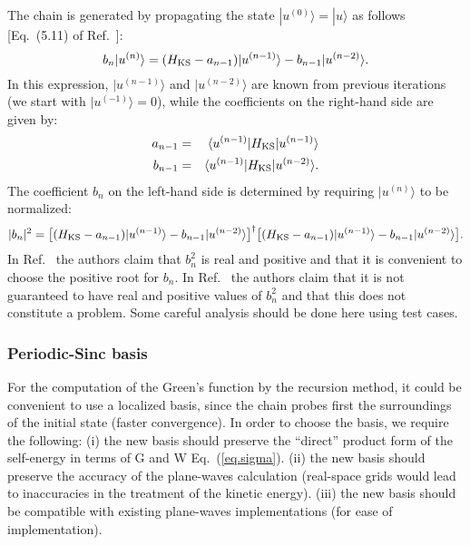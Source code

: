 \documentclass[12pt]{article}
\begin{document}
\noindent
The chain is generated by propagating the state $|u^{(0)}\rangle = |u\rangle$ as follows [Eq.\ (5.11) of Ref.\ \cite{haydock.ssp}]:
  \begin{equation}
  b_n |u^{(n)}\rangle = (H_{\rm KS}-a_{n-1})|u^{(n-1)}\rangle - b_{n-1} |u^{(n-2)}\rangle.
  \end{equation}
In this expression, $|u^{(n-1)}\rangle$ and $|u^{(n-2)}\rangle$ are known from previous iterations (we start with
$|u^{(-1)}\rangle=0$), while the coefficients on the right-hand side are given by:
  \begin{eqnarray}
  a_{n-1}&=& \langle u^{(n-1)}|H_{\rm KS}|u^{(n-1)}\rangle\\
  b_{n-1}&=& \langle u^{(n-1)}|H_{\rm KS}|u^{(n-2)}\rangle.
  \end{eqnarray}
The coefficient $b_n$ on the left-hand side is determined by requiring $|u^{(n)}\rangle$ to be normalized:
  \begin{equation}
  |b_n|^2 = \big[(H_{\rm KS}-a_{n-1})|u^{(n-1)}\rangle - b_{n-1} |u^{(n-2)}\rangle \big]^\dagger 
            \big[(H_{\rm KS}-a_{n-1})|u^{(n-1)}\rangle - b_{n-1} |u^{(n-2)}\rangle \big].
  \end{equation}
In Ref.\ \cite{haydock.ssp} the authors claim that $b_n^2$ is real and positive and that it is convenient
to choose the positive root for $b_n$. In Ref.\ \cite{ballentine} the authors claim that it is not guaranteed
to have real and positive values of $b_n^2$ and that this does not constitute a problem. Some careful
analysis should be done here using test cases.

\subsubsection*{Periodic-Sinc basis}

For the computation of the Green's function by the recursion method, it could be convenient to use a localized basis,
since the chain probes first the surroundings of the initial state (faster convergence).
In order to choose the basis, we require the following: (i) the new basis should preserve the ``direct'' product
form of the self-energy in terms of G and W Eq.\ (\ref{eq.sigma}). (ii) the new basis should preserve the accuracy
of the plane-waves calculation (real-space grids would lead to inaccuracies in the treatment of the kinetic
energy). (iii) the new basis should be compatible with existing plane-waves implementations (for ease of
implementation).
\end{document}
